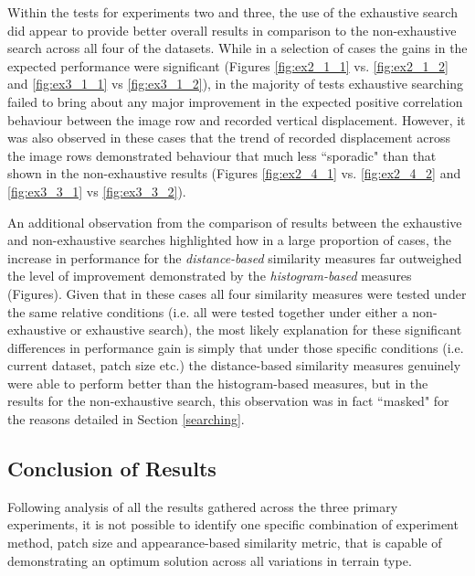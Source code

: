 Within the tests for experiments two and three, the use of the exhaustive search did appear to provide better overall results in comparison to the non-exhaustive search across all four of the datasets. While in a selection of cases the gains in the expected performance were significant (Figures \ref{fig:ex2_1_1} vs. \ref{fig:ex2_1_2} and  \ref{fig:ex3_1_1} vs \ref{fig:ex3_1_2}), in the majority of tests exhaustive searching failed to bring about any major improvement in the expected positive correlation behaviour between the image row and recorded vertical displacement. However, it was also observed in these cases that the trend of recorded displacement across the image rows demonstrated behaviour that much less ``sporadic" than that shown in the non-exhaustive results (Figures \ref{fig:ex2_4_1} vs. \ref{fig:ex2_4_2} and  \ref{fig:ex3_3_1} vs \ref{fig:ex3_3_2}).

An additional observation from the comparison of results between the exhaustive and non-exhaustive searches highlighted how in a large proportion of cases, the increase in performance for the \textit{distance-based} similarity measures far outweighed the level of improvement demonstrated by the \textit{histogram-based} measures (Figures). Given that in these cases all four similarity measures were tested under the same relative conditions (i.e. all were tested together under either a non-exhaustive or exhaustive search), the most likely explanation for these significant differences in performance gain is simply that under those specific conditions (i.e. current dataset, patch size etc.) the distance-based similarity measures genuinely were able to perform better than the histogram-based measures, but in the results for the non-exhaustive search, this observation was in fact ``masked" for the reasons detailed in Section \ref{searching}.

\subsection{Conclusion of Results}

Following analysis of all the results gathered across the three primary experiments, it is not possible to identify one specific combination of experiment method, patch size and appearance-based similarity metric, that is capable of demonstrating an optimum solution across all variations in terrain type.


